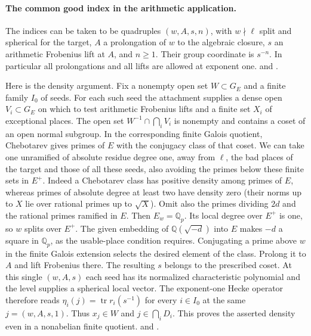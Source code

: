 \paragraph{The common good index in the arithmetic application.}
The indices can be taken to be quadruples \((w,A,s,n)\), with \(w\nmid\ell\)
split and spherical for the target, \(A\) a prolongation of \(w\) to the
algebraic closure, \(s\) an arithmetic Frobenius lift at \(A\), and
\(n\ge1\). Their group coordinate is \(s^{-n}\). In particular all
prolongations and all lifts are allowed at exponent one.
and .

Here is the density argument. Fix a nonempty open set \(W\subset G_E\) and
a finite family \(I_0\) of seeds. For each such seed the attachment supplies
a dense open \(V_i\subset G_E\) on which to test arithmetic Frobenius
lifts and a finite set \(X_i\) of
exceptional places. The open set \(W^{-1}\cap\bigcap_i V_i\) is nonempty
and contains a coset of an open normal subgroup. In the corresponding
finite Galois quotient, Chebotarev gives primes of \(E\) with the conjugacy
class of that coset. We can take one unramified of absolute residue degree
one, away from \(\ell\), the bad places of the target and those of all
these seeds, also avoiding the primes below these finite sets in \(E^+\).
Indeed a Chebotarev class has positive density among primes of \(E\),
whereas primes of absolute degree at least two have density zero (their
norms up to \(X\) lie over rational primes up to \(\sqrt X\)).
Omit also the primes dividing \(2d\) and the rational primes
ramified in \(E\). Then \(E_w=\mathbb Q_p\). Its local degree
over \(E^+\) is one, so \(w\) splits over \(E^+\). The given
embedding of \(\mathbb Q(\sqrt{-d})\) into \(E\) makes \(-d\)
a square in \(\mathbb Q_p\), as the usable-place condition requires.
Conjugating a prime above \(w\) in the finite Galois extension selects
the desired element of the class. Prolong it to \(A\) and lift Frobenius
there. The resulting \(s\) belongs to the prescribed coset. At this
single \((w,A,s)\) each seed has its normalized characteristic polynomial
and the level supplies a spherical local vector. The exponent-one Hecke
operator therefore reads \(\eta_i(j)=\operatorname{tr}r_i(s^{-1})\)
for every \(i\in I_0\) at the same \(j=(w,A,s,1)\). Thus
\(x_j\in W\) and \(j\in\bigcap_iD_i\). This proves the asserted density
even in a nonabelian finite quotient.
and .

